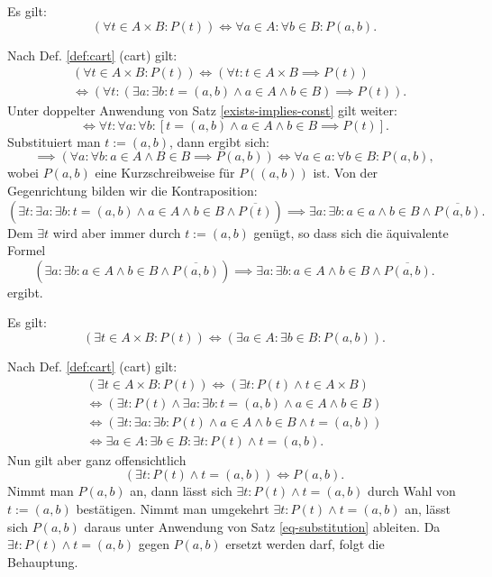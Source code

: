 \begin{Satz}\label{all-cart}
Es gilt:
\[(\forall t \in A{\times}B\colon P(t)) \iff \forall a{\in}A\colon\forall b{\in}B\colon P(a,b).\]
\end{Satz}

\begin{Beweis}
Nach Def. \ref{def:cart} (cart) gilt:
\begin{align*}
&(\forall t \in A{\times}B\colon P(t))\iff (\forall t\colon t\in A\times B\implies P(t))\\
&\iff (\forall t\colon (\exists a\colon\exists b\colon t=(a,b)\land a\in A\land b\in B)\implies P(t)).
\end{align*}
Unter doppelter Anwendung von Satz \ref{exists-implies-const} gilt weiter:
\[\iff \forall t\colon\forall a\colon\forall b\colon [t=(a,b)\land a\in A\land b\in B\implies P(t)].\]
Substituiert man $t:=(a,b)$, dann ergibt sich:
\[\implies (\forall a\colon\forall b\colon a\in A\land B\in B\implies P(a,b))
\iff \forall a{\in}a\colon\forall b{\in}B\colon P(a,b),\]
wobei $P(a,b)$ eine Kurzschreibweise für $P((a,b))$ ist.
Von der Gegenrichtung bilden wir die Kontraposition:
\[(\exists t\colon\exists a\colon\exists b\colon t=(a,b)\land a\in A\land b\in B\land \overline{P(t)})
\implies \exists a\colon\exists b\colon a\in a\land b\in B\land \overline{P(a,b)}.\]
Dem $\exists t$ wird aber immer durch $t:=(a,b)$ genügt, so dass sich die
äquivalente Formel
\[(\exists a\colon\exists b\colon a\in A\land b\in B\land \overline{P(a,b)})
\implies \exists a\colon \exists b\colon a\in A\land b\in B\land \overline{P(a,b)}.\]
ergibt.\;\qedsymbol
\end{Beweis}

\begin{Satz}\label{exists-cart}
Es gilt:
\[(\exists t\in A{\times}B\colon P(t))
\iff (\exists a{\in}A\colon \exists b{\in}B\colon P(a,b)).\]
\end{Satz}

\begin{Beweis}
Nach Def. \ref{def:cart} (cart) gilt:
\begin{gather*}
(\exists t{\in}A{\times}B\colon P(t))
\iff (\exists t\colon P(t)\land t\in A\times B)\\
\iff (\exists t\colon P(t)\land \exists a\colon\exists b\colon t=(a,b)\land a\in A\land b\in B)\\
\iff (\exists t\colon \exists a\colon \exists b\colon P(t)\land a\in A\land b\in B\land t=(a,b))\\
\iff \exists a{\in}A\colon \exists b{\in}B\colon \exists t\colon P(t)\land t=(a,b).
\end{gather*}
Nun gilt aber ganz offensichtlich
\[(\exists t\colon P(t)\land t=(a,b))\iff P(a,b).\]
Nimmt man $P(a,b)$ an, dann lässt sich $\exists t\colon P(t)\land t=(a,b)$
durch Wahl von $t:=(a,b)$ bestätigen. Nimmt man umgekehrt
$\exists t\colon P(t)\land t=(a,b)$ an, lässt sich $P(a,b)$ daraus
unter Anwendung von Satz \ref{eq-substitution} ableiten.
Da $\exists t\colon P(t)\land t=(a,b)$ gegen $P(a,b)$ ersetzt
werden darf, folgt die Behauptung.\,\qedsymbol
\end{Beweis}

